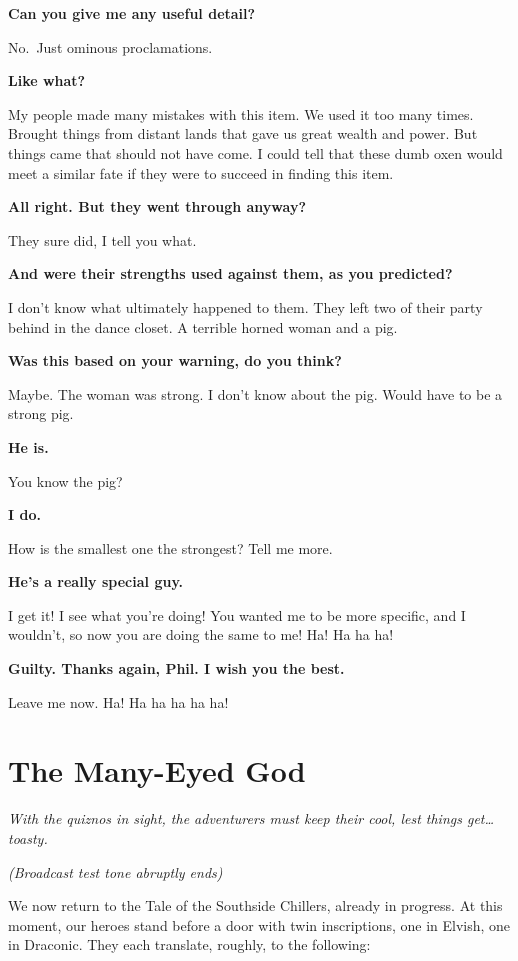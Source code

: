 \documentclass[smalldemyvopaper,11pt,twoside,onecolumn,openright,extrafontsizes]{memoir}
\newcommand{\chapdesc}[1]{
    \begin{flushright}
    \emph{{#1}}
    \end{flushright}
    \vspace{26pt}
}
\begin{document}
\textbf{Can you give me any useful detail?}

No.~Just ominous proclamations.

\textbf{Like what?}

My people made many mistakes with this item. We used it too many times.
Brought things from distant lands that gave us great wealth and power.
But things came that should not have come. I could tell that these dumb
oxen would meet a similar fate if they were to succeed in finding this
item.

\textbf{All right. But they went through anyway?}

They sure did, I tell you what.

\textbf{And were their strengths used against them, as you predicted?}

I don't know what ultimately happened to them. They left two of their
party behind in the dance closet. A terrible horned woman and a pig.

\textbf{Was this based on your warning, do you think?}

Maybe. The woman was strong. I don't know about the pig. Would have to
be a strong pig.

\textbf{He is.}

You know the pig?

\textbf{I do.}

How is the smallest one the strongest? Tell me more.

\textbf{He's a really special guy.}

I get it! I see what you're doing! You wanted me to be more specific,
and I wouldn't, so now you are doing the same to me! Ha! Ha ha ha!

\textbf{Guilty. Thanks again, Phil. I wish you the best.}

Leave me now. Ha! Ha ha ha ha ha!


\chapter{The Many-Eyed God}
\chapdesc{With the quiznos in sight, the adventurers must keep their cool, lest things get… toasty.}

\emph{(Broadcast test tone abruptly ends)}

We now return to the Tale of the Southside Chillers, already in
progress. At this moment, our heroes stand before a door with twin
inscriptions, one in Elvish, one in Draconic. They each translate,
roughly, to the following:
\end{document}

